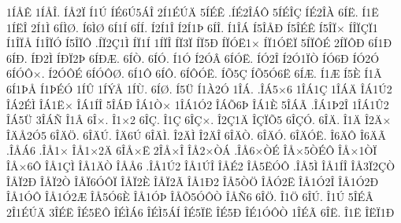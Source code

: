 {1^^cd^^c5^^ca
1^^cd^^c5^^ce.
^^cd^^c52^^cf
^^cd1^^da
^^cd^^c96^^da5^^c1^^ce
2^^cd1^^c9^^da^^c4
5^^cd^^c9^^ca
.^^cd^^c92^^ce^^c1^^d4
5^^cd^^c9^^ce^^c7
^^cd^^c92^^ce^^c0
6^^cd^^cb.
^^cd1^^cb
1^^cd^^cb^^ce
2^^cd1^^cc
6^^cd^^cc^^d8.
^^cd6^^cc^^d8
6^^cd1^^cd
6^^cd^^cd.
^^cd2^^cd1^^ce
^^cd2^^cd1^^de
6^^cd^^ce.
^^cd1^^ce^^c1
^^cd5^^ce^^c5^^d0
^^cd5^^ce^^c9^^ca
^^cd5^^ce^^cf^^d7
^^cd^^ce^^cf^^c7^^cf1
^^cd1^^ce^^cf^^c5
^^cd1^^ce^^cf^^d3
^^cd5^^ce^^cf^^d4
.^^cd^^cf2^^c71^^cc
^^cd^^cf1^^cd
1^^cd^^cf^^ce
^^cd^^cf3^^cf
^^cd^^cf5^^d0
^^cd^^cf^^d3^^cb1^^d7
^^cd^^cf1^^d3^^cb^^cf
5^^cd^^cf^^d4^^c9
2^^cd^^cf^^d4^^d0
6^^cd1^^d0
6^^cd^^d0.
^^cd^^d02^^cc
^^cd^^d0^^cf2^^de
6^^cd^^d0^^c6.
6^^cd^^d2.
6^^cd^^d3.
^^cd1^^d3
^^cd2^^d3^^c2
6^^cd^^d3^^cb.
^^cd^^d32^^ce
^^cd2^^d31^^cf^^d2
^^cd^^d36^^d0
^^cd^^d32^^d3
6^^cd^^d3^^d4^^d7.
^^cd2^^d3^^d4^^c9
6^^cd^^d3^^d4^^d8.
6^^cd1^^d4
6^^cd^^d4.
6^^cd^^d4^^d3^^cb.
^^cd^^d55^^c7
^^cd^^d55^^d36^^cb
6^^cd^^c6.
^^cd1^^c6
^^cd5^^c8
^^cd1^^c3
6^^cd1^^de^^c5
^^cd1^^de^^c9^^d3
1^^cd^^db
1^^cd^^dd^^c5
1^^cd^^d9.
6^^cd^^d8.
^^cd5^^dc
^^cd1^^c02^^d3
1^^ce^^c1.
.^^ce^^c15^^d76
1^^ce^^c11^^c7
1^^ce^^c1^^c4
^^ce^^c11^^da2
^^ce^^c12^^c9^^cc
^^ce^^c11^^cb^^d7
^^ce^^c11^^cd^^ce
5^^ce^^c1^^d0
^^ce^^c11^^d2^^d7
1^^ce^^c11^^d32
^^ce^^c1^^d56^^de
^^ce^^c11^^c8
5^^ce^^c1^^c3
.^^ce^^c11^^de2^^ce
1^^ce^^c11^^db2
^^ce^^c15^^dc
3^^ce^^c1^^d1
^^ce1^^c2
6^^ce^^d7.
^^ce1^^d72
6^^ce^^c7.
^^ce1^^c7
6^^ce^^c7^^d7.
^^ce2^^c71^^c4
^^ce^^c7^^cf^^d55
6^^ce^^c7^^d3.
6^^ce^^c4.
^^ce1^^c4
^^ce2^^c4^^d7
^^ce^^c4^^c52^^d35
6^^ce^^c4^^d6.
6^^ce^^c4^^da.
^^ce^^c46^^da
6^^ce^^c4^^cc.
^^ce2^^c4^^cc
^^ce2^^c4^^ce
6^^ce^^c4^^d2.
6^^ce^^c4^^d3.
6^^ce^^c4^^d3^^cb.
^^ce6^^c4^^d4
^^ce6^^c4^^c3
.^^ce^^c5^^c16
.^^ce^^c51^^d7
^^ce^^c51^^d72^^c4
6^^ce^^c5^^d7^^cb
2^^ce^^c5^^d7^^ce
^^ce^^c52^^d7^^d2^^c1
.^^ce^^c56^^d7^^d2^^c9
^^ce^^c5^^d75^^d2^^c9^^d4
^^ce^^c5^^d71^^d2^^cf
^^ce^^c5^^d76^^d4
^^ce^^c51^^c7^^cc
^^ce^^c51^^c4^^d2
^^ce^^c5^^c56
.^^ce^^c51^^da2
^^ce^^c51^^da^^ce
^^ce^^c5^^c92
^^ce^^c55^^cb^^d3^^d4
.^^ce^^c55^^cc
^^ce^^c51^^cd^^ce
^^ce^^c53^^cf2^^c7^^d2
^^ce^^c5^^cf2^^d0
^^ce^^c5^^cf2^^d2
^^ce^^c5^^cf6^^d3^^d4^^cf
^^ce^^c5^^cf2^^c8
^^ce^^c5^^cf2^^c3
^^ce^^c51^^d02
^^ce^^c55^^d2^^d6
^^ce^^c5^^d32^^cb
^^ce^^c51^^d32^^ce
^^ce^^c51^^d32^^d0
^^ce^^c51^^d3^^d4
^^ce^^c51^^d32^^c6
^^ce^^c55^^d36^^c8
^^ce^^c51^^d3^^de
^^ce^^c5^^d55^^d3^^d4^^d2
^^ce^^c5^^d16
6^^ce^^d6.
^^ce1^^d6
6^^ce^^da.
^^ce1^^da
5^^ce^^c9^^c2
2^^ce1^^c9^^da^^c4
3^^ce^^c9^^cb
^^ce^^c95^^cb^^d4
^^ce^^c9^^cc^^c16
^^ce^^c9^^cc5^^c1^^cd
^^ce^^c95^^cf^^cb
^^ce^^c95^^d0
^^ce^^c91^^d3^^d4^^d2
1^^ce^^c9^^c3
6^^ce^^cb.
^^ce1^^cb
^^ce^^cb^^cf1^^d0
}
